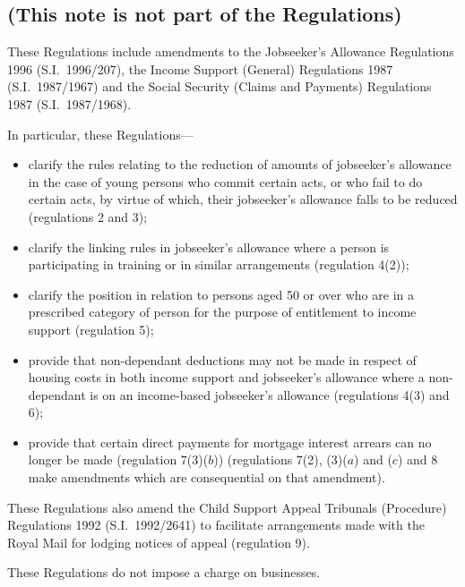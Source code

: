 \documentclass[12pt,a4paper]{article}
\begin{document}
\renewcommand\parthead{--- Explanatory Note}

\subsection*{(This note is not part of the Regulations)}

These Regulations include amendments to the Jobseeker’s Allowance Regulations 1996 (S.I.\ 1996/207), the Income Support (General) Regulations 1987 (S.I.\ 1987/1967) and the Social Security (Claims and Payments) Regulations 1987 (S.I.\ 1987/1968).

  In particular, these Regulations—
\begin{itemize}
\item clarify the rules relating to the reduction of amounts of jobseeker’s allowance in the case of young persons who commit certain acts, or who fail to do certain acts, by virtue of which, their jobseeker’s allowance falls to be reduced (regulations 2 and 3);
\item clarify the linking rules in jobseeker’s allowance where a person is participating in training or in similar arrangements (regulation 4(2));
\item clarify the position in relation to persons aged 50 or over who are in a prescribed category of person for the purpose of entitlement to income support (regulation 5);
\item provide that non-dependant deductions may not be made in respect of housing costs in both income support and jobseeker’s allowance where a non-dependant is on an income-based jobseeker’s allowance (regulations 4(3) and 6);
\item provide that certain direct payments for mortgage interest arrears can no longer be made (regulation 7(3)($b$)) (regulations 7(2), (3)($a$) and ($c$) and 8 make amendments which are consequential on that amendment).
\end{itemize}

  These Regulations also amend the Child Support Appeal Tribunals (Procedure) Regulations 1992 (S.I.\ 1992/2641) to facilitate arrangements made with the Royal Mail for lodging notices of appeal (regulation 9).

  These Regulations do not impose a charge on businesses.
\end{document}
